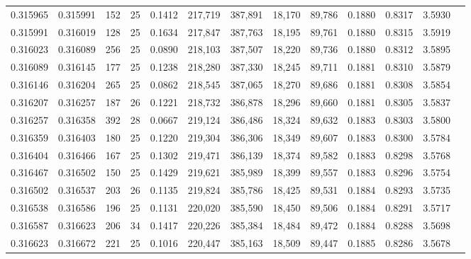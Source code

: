 \begin{tabular}{rrrrrrrrrrrrr}
0.315965 & 0.315991 &   152 &  25 &                                     0.1412 & 217,719 & 387,891 &  18,170 &  89,786 & 0.1880 & 0.8317 & 3.5930 \\
0.315991 & 0.316019 &   128 &  25 &                                     0.1634 & 217,847 & 387,763 &  18,195 &  89,761 & 0.1880 & 0.8315 & 3.5919 \\
0.316023 & 0.316089 &   256 &  25 &                                     0.0890 & 218,103 & 387,507 &  18,220 &  89,736 & 0.1880 & 0.8312 & 3.5895 \\
0.316089 & 0.316145 &   177 &  25 &                                     0.1238 & 218,280 & 387,330 &  18,245 &  89,711 & 0.1881 & 0.8310 & 3.5879 \\
0.316146 & 0.316204 &   265 &  25 &                                     0.0862 & 218,545 & 387,065 &  18,270 &  89,686 & 0.1881 & 0.8308 & 3.5854 \\
0.316207 & 0.316257 &   187 &  26 &                                     0.1221 & 218,732 & 386,878 &  18,296 &  89,660 & 0.1881 & 0.8305 & 3.5837 \\
0.316257 & 0.316358 &   392 &  28 &                                     0.0667 & 219,124 & 386,486 &  18,324 &  89,632 & 0.1883 & 0.8303 & 3.5800 \\
0.316359 & 0.316403 &   180 &  25 &                                     0.1220 & 219,304 & 386,306 &  18,349 &  89,607 & 0.1883 & 0.8300 & 3.5784 \\
0.316404 & 0.316466 &   167 &  25 &                                     0.1302 & 219,471 & 386,139 &  18,374 &  89,582 & 0.1883 & 0.8298 & 3.5768 \\
0.316467 & 0.316502 &   150 &  25 &                                     0.1429 & 219,621 & 385,989 &  18,399 &  89,557 & 0.1883 & 0.8296 & 3.5754 \\
0.316502 & 0.316537 &   203 &  26 &                                     0.1135 & 219,824 & 385,786 &  18,425 &  89,531 & 0.1884 & 0.8293 & 3.5735 \\
0.316538 & 0.316586 &   196 &  25 &                                     0.1131 & 220,020 & 385,590 &  18,450 &  89,506 & 0.1884 & 0.8291 & 3.5717 \\
0.316587 & 0.316623 &   206 &  34 &                                     0.1417 & 220,226 & 385,384 &  18,484 &  89,472 & 0.1884 & 0.8288 & 3.5698 \\
0.316623 & 0.316672 &   221 &  25 &                                     0.1016 & 220,447 & 385,163 &  18,509 &  89,447 & 0.1885 & 0.8286 & 3.5678 \\

\end{tabular}
